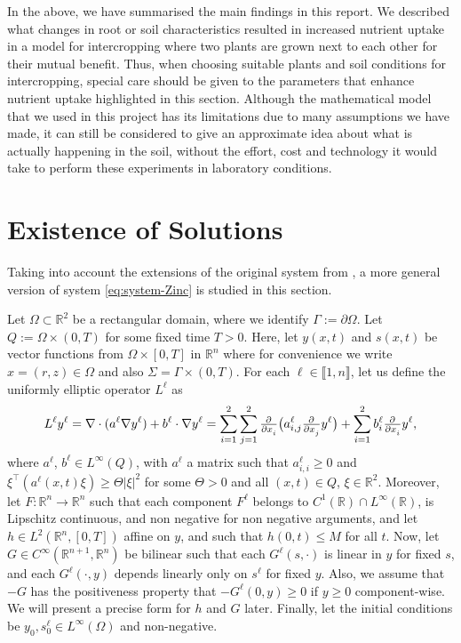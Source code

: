 \documentclass[11pt]{article}
\newcommand{\R}{\mathbb{R}}
\newcommand{\llb}{\llbracket}
\newcommand{\rrb}{\rrbracket}
\numberwithin{equation}{section}
\begin{document}
In the above, we have summarised the main findings in this report. We described what changes in root or soil characteristics resulted in increased nutrient uptake in a model for intercropping where two plants are grown next to each other for their mutual benefit. Thus, when choosing suitable plants and soil conditions for intercropping, special care should be given to the parameters that enhance nutrient uptake highlighted in this section. Although the mathematical model that we used in this project has its limitations due to many assumptions we have made, it can still be considered to give an approximate idea about what is actually happening in the soil, without the effort, cost and technology it would take to perform these experiments in laboratory conditions.

\section{Existence of Solutions}
\label{sec:Existence}

Taking into account the extensions of the original system from \cite{Ptashnyk-2011}, a more general version of system \eqref{eq:system-Zinc} is studied in this section. 

Let \(\Omega \subset \R^2\) be a rectangular domain, where we identify \(\Gamma := \partial \Omega\). Let \( Q := \Omega \times (0,T)\) for some fixed time \(T >0\).
Here, let \(y(x,t)\) and \(s(x,t)\) be vector functions from \(\Omega \times [0,T]\) in \(\R^{n}\) where for convenience we write \( x = (r,z) \in \Omega\) and also \(\Sigma = \Gamma \times (0,T)\). For each \(\ell \in \llb1,n\rrb\), let us define the uniformly elliptic operator \(L^\ell\) as
\[
	L^\ell y^\ell = \nabla \cdot (a^\ell \nabla y^\ell) + b^\ell \cdot \nabla y^\ell
	= \sum_{i=1}^{2}  \sum_{j=1}^2 \pd{ }{x_i} \big( a_{i,j}^\ell \pd{ }{x_j} y^\ell \big) + \sum_{i=1}^2 b_i^\ell \pd{ }{x_i} y^\ell,
\]
where \(a^\ell\), \(b^\ell \in L^\infty (Q)\), with \(a^\ell\) a matrix such that \(a^\ell_{i,i} \geq 0\) and
\(
	\xi^\top (a^\ell (x,t) \xi) \geq \Theta |\xi|^2
\)
for some \(\Theta > 0\) and all \((x,t) \in Q\), \( \xi \in \R^2\).
%
Moreover, let \(F: \R^n \to \R^n\) such that each component \( F^\ell \) belongs to \( C^1 (\R) \cap L^\infty (\R)\), is Lipschitz continuous, and non negative for non negative arguments, and let \(h\in L^2 (\R^n,[0,T]) \) affine on \(y\), and such that \(h(0,t) \leq M \) for all \(t\).
Now, let \(G \in C^\infty(\R^{n+1}, \R^n)\) be bilinear such that each \( G^\ell(s,\cdot)\) is linear in \( y\) for fixed \(s\), and each \( G^\ell (\cdot, y)\) depends linearly only on \( s^\ell\) for fixed \(y\). Also, we assume that \(-G\) has the positiveness property that \(-G^\ell (0, y) \geq 0\) if \( y\geq 0\) component-wise. We will present a precise form for \(h\) and \(G\) later.
Finally, let the initial conditions be \( y_0, s_0^\ell \in L^\infty (\Omega)\) and non-negative.
\end{document}
